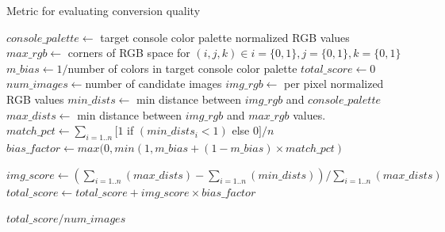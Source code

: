 \documentclass[10pt,twocolumn,letterpaper]{article}
\begin{document}
\begin{algorithm*}
   \caption{Metric for evaluating conversion quality}
   \begin{algorithmic}
      \label{alg:alg1}

      \STATE $console\_palette \leftarrow$ target console color palette normalized RGB values
      \STATE $max\_rgb \leftarrow$ corners of RGB space for $(i, j, k) \in i=\{0,1\}, j=\{0,1\}, k=\{0,1\}$
      \STATE $m\_bias \leftarrow 1 / $number of colors in target console color palette
      \STATE $total\_score \leftarrow 0$
      \STATE $num\_images \leftarrow $number of candidate images      
      \STATE
      \STATE $img\_rgb \leftarrow $ per pixel normalized RGB values
      \STATE $min\_dists \leftarrow $ min distance between $img\_rgb$ and $console\_palette$
      \STATE $max\_dists \leftarrow $ min distance between $img\_rgb$ and $max\_rgb$ values.
      \STATE $match\_pct \leftarrow \sum_{i=1..n}[ 1 $ if $(min\_dists_i < 1)$ else $0] / n$
      \STATE $bias\_factor \leftarrow max(0, min(1, m\_bias + (1 - m\_bias) \times match\_pct)$

      \STATE $img\_score \leftarrow (\sum_{i=1..n}(max\_dists) - \sum_{i=1..n}(min\_dists)) / \sum_{i=1..n}(max\_dists)$
      \STATE $total\_score \leftarrow total\_score + img\_score \times bias\_factor$

      \ENDFOR

      \RETURN $total\_score/num\_images$

   \end{algorithmic}
\end{algorithm*}

{\small


}
\end{document}
